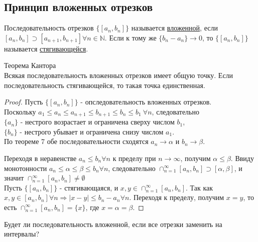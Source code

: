 \subsection{Принцип вложенных отрезков}
    \begin{definition}
        Последовательность отрезков $\{[a_{n}, b_{n}]\}$ называется \underline{вложенной}, если $[a_{n}, b_{n}] \supset [a_{n+1}, b_{n+1}] \forall n \in \mathds{N}$.
        Если к тому же $\{b_{n}-a_{n}\} \to 0$, то $\{[a_{n}, b_{n}]\}$ называется \underline{стягивающейся}.
    \end{definition}

    \begin{theorem}
        Теорема Кантора\\
        Всякая последовательность вложенных отрезков имеет общую точку. Если последовательность стягивающейся, то такая точка единственная.
    \end{theorem}

    \begin{proof}
        Пусть $\{[a_{n}, b_{n}]\}$ - опследовательность вложенных отрезков.\\
        Поскольку $a_1 \leq a_{n} \leq a_{n+1} \leq b_{n+1} \leq b_{n} \leq b_1 \ \forall n$, следовательно \\
        $\{a_{n}\}$ - нестрого возрастает и ограничена сверху числом $b_1$,\\
        $\{b_{n}\}$ - нестрого убывает и ограничена снизу числом $a_1$.\\
        По теореме 7 обе последовательности сходятся $a_{n} \to \alpha$ и $b_{n} \to \beta$.

        Переходя в неравенстве $a_{n} \leq b_{n} \forall n$ к пределу при $n \to \infty$, получим $\alpha \leq \beta$. Ввиду монотонности $a_{n} \leq \alpha \leq \beta \leq b_{n} \forall n$, следовательно $\cap_{n = 1}^{\infty}[a_{n}, b_{n}] \supset [\alpha, \beta]$, и значит $\cap_{n = 1}^{\infty}[a_{n}, b_{n}] \neq \emptyset$\\

        Пусть $\{[a_{n}, b_{n}]\}$ - стягивающаяся, и $x, y \in \cap_{n = 1}^{\infty} [a_{n}, b_{n}]$. Так как $x, y \in [a_{n}, b_{n}] \forall n \Rightarrow |x-y| \leq b_{n} - a_{n} \forall n$. Переходя к пределу, получим $x = y$, то есть $\cap_{n = 1}^{\infty}[a_{n}, b_{n}] = \{x\}$, где $x = \alpha = \beta$.
    \end{proof}

    \begin{problem}
        Будет ли последовательность вложенной, если все отрезки заменить на интервалы?
    \end{problem}

